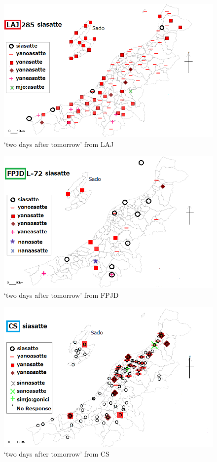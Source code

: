 \documentclass[output=paper]{LSP/langsci}
\begin{document}
\begin{figure}
\includegraphics[width=.75\textwidth]{illustrations/fuku2_fig5a}
\caption{`two days after tomorrow' from LAJ}
\label{fig:fuku:5a}
\end{figure}

\begin{figure}
\includegraphics[width=.75\textwidth]{illustrations/fuku2_fig5b}
\caption{`two days after tomorrow' from FPJD}
\label{fig:fuku:5b}
\end{figure}

\begin{figure}
\includegraphics[width=.75\textwidth]{illustrations/fuku2_fig5c}
\caption{`two days after tomorrow' from CS}
\label{fig:fuku:5c}
\end{figure}
\end{document}
